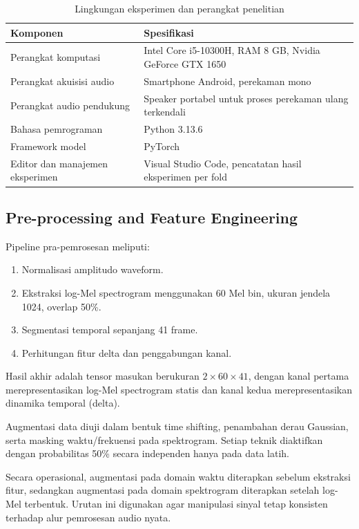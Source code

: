 \documentclass[10pt,a4paper]{jurnalvarian}
\let\LaTeXsubsection\subsection
\def\subsection{\setlength{\leftskip}{0.6cm}\LaTeXsubsection}
\begin{document}
\begin{table}[H]
\centering
\fontsize{8pt}{10pt}\selectfont
\caption{Lingkungan eksperimen dan perangkat penelitian}
\begin{tabular}{p{4.2cm}p{7.2cm}}
\hline
Komponen & Spesifikasi \\
\hline
Perangkat komputasi & Intel Core i5-10300H, RAM 8 GB, Nvidia GeForce GTX 1650 \\
Perangkat akuisisi audio & Smartphone Android, perekaman mono \\
Perangkat audio pendukung & Speaker portabel untuk proses perekaman ulang terkendali \\
Bahasa pemrograman & Python 3.13.6 \\
Framework model & PyTorch \\
Editor dan manajemen eksperimen & Visual Studio Code, pencatatan hasil eksperimen per fold \\
\hline
\end{tabular}
\end{table}

\subsection{Pre-processing and Feature Engineering}
Pipeline pra-pemrosesan meliputi:
\begin{enumerate}[leftmargin=1.25cm]
\item Normalisasi amplitudo waveform.
\item Ekstraksi log-Mel spectrogram menggunakan 60 Mel bin, ukuran jendela 1024, overlap 50\%.
\item Segmentasi temporal sepanjang 41 frame.
\item Perhitungan fitur delta dan penggabungan kanal.
\end{enumerate}

Hasil akhir adalah tensor masukan berukuran $2 \times 60 \times 41$, dengan kanal pertama merepresentasikan log-Mel spectrogram statis dan kanal kedua merepresentasikan dinamika temporal (delta).

Augmentasi data diuji dalam bentuk time shifting, penambahan derau Gaussian, serta masking waktu/frekuensi pada spektrogram. Setiap teknik diaktifkan dengan probabilitas 50\% secara independen hanya pada data latih.

Secara operasional, augmentasi pada domain waktu diterapkan sebelum ekstraksi fitur, sedangkan augmentasi pada domain spektrogram diterapkan setelah log-Mel terbentuk. Urutan ini digunakan agar manipulasi sinyal tetap konsisten terhadap alur pemrosesan audio nyata.
\end{document}
